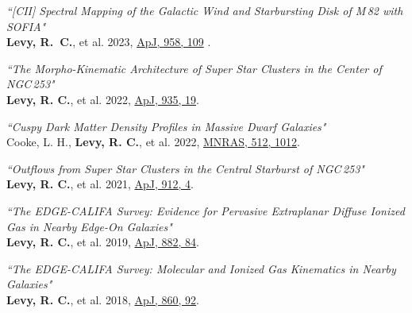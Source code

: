 \documentclass[11pt]{article}
\begin{document}
\begin{etaremune}[itemsep=-18pt]
\item \textit{``[CII] Spectral Mapping of the Galactic Wind and Starbursting Disk of M\,82 with SOFIA"}\\
{\bf Levy, R.~C.}, et al. 2023, \href{https://ui.adsabs.harvard.edu/abs/2023ApJ...958..109L/abstract}{ApJ, 958, 109} .\smallskip\\ 

\item \textit{``The Morpho-Kinematic Architecture of Super Star Clusters in the Center of NGC\,253"}\\
{\bf Levy, R. C.}, et al. 2022, \href{https://ui.adsabs.harvard.edu/abs/2022ApJ...935...19L/abstract}{ApJ, 935, 19}. \smallskip\\

\item \textit{``Cuspy Dark Matter Density Profiles in Massive Dwarf Galaxies"}\\
Cooke, L. H., {\bf Levy, R. C.}, et al. 2022, \href{https://ui.adsabs.harvard.edu/abs/2022MNRAS.512.1012C/abstract}{MNRAS, 512, 1012}.\smallskip\\

\item \textit{``Outflows from Super Star Clusters in the Central Starburst of NGC\,253"}\\
{\bf Levy, R. C.}, et al. 2021, \href{https://ui.adsabs.harvard.edu/abs/2021ApJ...912....4L/abstract}{ApJ, 912, 4}.\smallskip\\

\item \textit{``The EDGE-CALIFA Survey: Evidence for Pervasive Extraplanar Diffuse Ionized Gas in Nearby Edge-On Galaxies"}\\
{\bf Levy, R. C.}, et al. 2019, \href{https://ui.adsabs.harvard.edu/abs/2019arXiv190505196L/abstract}{ApJ, 882, 84}.\smallskip\\

\item \textit{``The EDGE-CALIFA Survey: Molecular and Ionized Gas Kinematics in Nearby Galaxies"}\\
 {\bf Levy, R. C.}, et al. 2018, \href{https://ui.adsabs.harvard.edu/abs/2018ApJ...860...92L/abstract}{ApJ, 860, 92}.\\

\end{etaremune}
\end{document}
